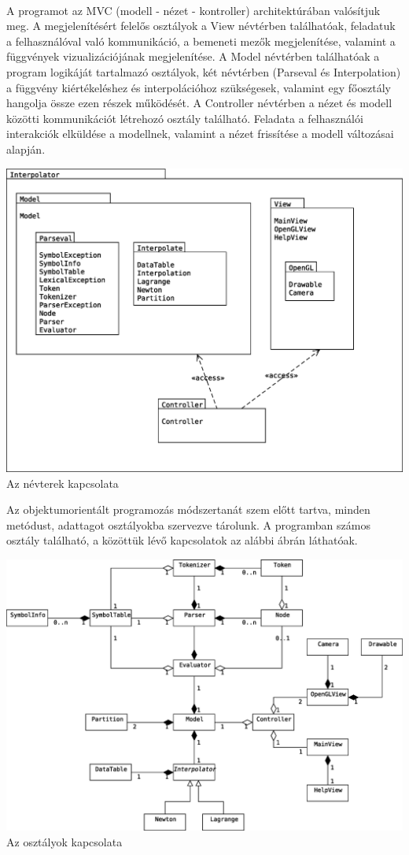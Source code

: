 \documentclass[12pt]{report}
\begin{document}
\paragraph{}
A programot az MVC (modell - nézet - kontroller) architektúrában valósítjuk meg. A megjelenítésért felelős osztályok a View névtérben találhatóak, feladatuk a felhasználóval való kommunikáció, a bemeneti mezők megjelenítése, valamint a függvények vizualizációjának megjelenítése. A Model névtérben találhatóak a program logikáját tartalmazó osztályok, két névtérben (Parseval és Interpolation) a függvény kiértékeléshez és interpolációhoz szükségesek, valamint egy főosztály hangolja össze ezen részek működését. A Controller névtérben a nézet és modell közötti kommunikációt létrehozó osztály található. Feladata a felhasználói interakciók elküldése a modellnek, valamint a nézet frissítése a modell változásai alapján.
\begin{center}
\includegraphics[width=14cm]{pics/uml/package}\\
{\footnotesize Az névterek kapcsolata}
\end{center}
Az objektumorientált programozás módszertanát szem előtt tartva, minden metódust, adattagot osztályokba szervezve tárolunk. A programban számos osztály található, a közöttük lévő kapcsolatok az alábbi ábrán láthatóak.
\begin{center}
\includegraphics[width=14cm]{pics/uml/classes}\\
{\footnotesize Az osztályok kapcsolata}
\end{center}
\end{document}
